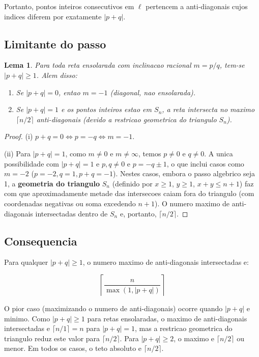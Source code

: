 \documentclass[5p]{elsarticle}
\newtheorem{lemma}{Lema}[section]
\theoremstyle{definition}
\begin{document}
Portanto, pontos inteiros consecutivos em $\ell$ pertencem a anti-diagonais cujos
indices diferem por exatamente $|p+q|$.

\subsection{Limitante do passo}

\begin{lemma}
  Para toda reta ensolarada com inclinacao racional $m = p/q$, tem-se $|p+q| \geq 1$.
  Alem disso:
  \begin{enumerate}[label=(\roman*)]
    \item Se $|p+q| = 0$, entao $m = -1$ (diagonal, nao ensolarada).
    \item Se $|p+q| = 1$ e os pontos inteiros estao em $S_n$, a reta intersecta no
      maximo $\lceil n/2 \rceil$ anti-diagonais (devido a restricao geometrica do
      triangulo $S_n$).
  \end{enumerate}
\end{lemma}

\begin{proof}
  (i) $p+q = 0 \iff p = -q \iff m = -1$.

  (ii) Para $|p+q| = 1$, como $m \neq 0$ e $m \neq \infty$, temos $p \neq 0$ e
  $q \neq 0$. A unica possibilidade com $|p+q| = 1$ e $p,q \neq 0$ e $p = -q \pm 1$,
  o que inclui casos como $m = -2$ ($p=-2, q=1, p+q=-1$). Nestes casos, embora o
  passo algebrico seja 1, a \textbf{geometria do triangulo} $S_n$ (definido por
  $x \geq 1$, $y \geq 1$, $x+y \leq n+1$) faz com que aproximadamente metade das
  intersecoes caiam fora do triangulo (com coordenadas negativas ou soma excedendo
  $n+1$). O numero maximo de anti-diagonais intersectadas dentro de $S_n$ e, portanto,
  $\lceil n/2 \rceil$.
\end{proof}

\subsection{Consequencia}

Para qualquer $|p+q| \geq 1$, o numero maximo de anti-diagonais intersectadas e:

\[
\left\lceil \frac{n}{\max(1, |p+q|)} \right\rceil
\]

O pior caso (maximizando o numero de anti-diagonais) ocorre quando $|p+q|$ e minimo.
Como $|p+q| \geq 1$ para retas ensolaradas, o maximo de anti-diagonais intersectadas e
$\lceil n/1 \rceil = n$ para $|p+q| = 1$, mas a restricao geometrica do triangulo reduz
este valor para $\lceil n/2 \rceil$. Para $|p+q| \geq 2$, o maximo e $\lceil n/2 \rceil$
ou menor. Em todos os casos, o teto absoluto e $\lceil n/2 \rceil$.
\end{document}
